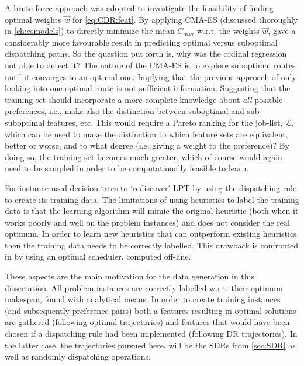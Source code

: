 A brute force approach was adopted to investigate the feasibility of finding 
optimal weights $\vec{w}$ for \cref{eq:CDR:feat}. 
By applying CMA-ES (discussed thoroughly in \cref{ch:esmodels}) to directly 
minimize the mean $C_{\max}$  w.r.t. the weights $\vec{w}$, gave a considerably 
more favourable result in predicting optimal versus suboptimal dispatching 
paths. 
So the question put forth is, why was the ordinal regression not able to detect 
it?
The nature of the CMA-ES is to explore suboptimal routes until it converges to 
an optimal one. 
Implying that the previous approach of only looking into one optimal route is 
not sufficient information. 
Suggesting that the training set should incorporate a more complete knowledge 
about \emph{all} possible preferences, i.e., make also the distinction between 
suboptimal and sub-suboptimal features, etc.  
This would require a Pareto ranking for the job-list, $\mathcal{L}$, which can 
be used to make the distinction to which feature sets are equivalent, better or 
worse, and to what degree (i.e. giving a weight to the preference)? 
By doing so, the training set becomes much greater, which of course would again 
need to be sampled in order to be computationally feasible to learn. 

For instance \cite{Siggi05} used decision trees to `rediscover' LPT by using 
the dispatching rule to create its training data. The limitations of using 
heuristics to label the training data is that the learning algorithm will mimic 
the original heuristic (both when it works poorly and well on the problem 
instances) and does not consider the real optimum. In order to learn new 
heuristics that can outperform existing heuristics then the training data needs 
to be correctly labelled. This drawback is confronted in 
\citep{Malik08,Russell09,Siggi10} by using an optimal scheduler, computed 
off-line. 

These aspects are the main motivation for the data generation in this 
dissertation. 
All problem instances are correctly labelled w.r.t. their optimum makespan, 
found with analytical means. %
In order to create training instances (and subsequently preference pairs) both 
a features resulting in optimal solutions are gathered (following optimal 
trajectories) and features that would have been chosen if a dispatching rule 
had been implemented (following DR trajectories). 
In the latter case, the trajectories pursued here, will be the SDRs from 
\cref{sec:SDR} as well as randomly dispatching operations.

